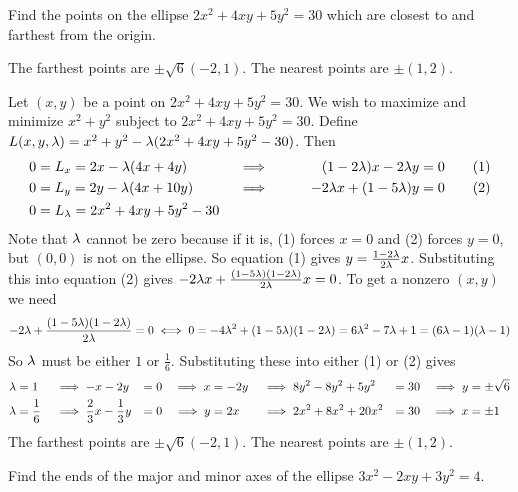 \begin{question}[M200 2004A] %
Find the points on the ellipse $2x^2 + 4xy + 5y^2 = 30$ which are closest 
to and farthest from the origin.
\end{question}

%

\begin{answer}
The farthest points are $\pm\sqrt{6}(-2,1)$.
The nearest points are $\pm(1,2)$.
\end{answer}

\begin{solution}
Let $(x,y)$ be a point on $2x^2 + 4xy + 5y^2 = 30$. 
We wish to maximize and minimize $x^2+y^2$ subject to $2x^2 + 4xy + 5y^2 = 30$. 
Define $L(x,y,\lambda)=x^2+y^2-\lambda(2x^2 + 4xy + 5y^2 - 30)$. Then
\begin{alignat*}{5}
0&=L_x=2x-\lambda (4x+4y)\qquad&&\implies\qquad &(1-2\lambda)x-2\lambda y&=0\tag{1} \\
0&=L_y=2y-\lambda (4x+10y)\qquad&&\implies& -2\lambda x+(1-5\lambda)y&=0\tag{2} \\
0&=L_\lambda=2x^2 + 4xy + 5y^2 - 30
\end{alignat*}
 Note that
$\lambda$ cannot be zero because if it is, (1) forces $x=0$ and (2) forces
$y=0$, but $(0,0)$ is not on the ellipse. So equation (1) 
gives $y=\frac{1-2\lambda}{2\lambda}x$. Substituting this into
equation (2) gives $-2\lambda x+\frac{(1-5\lambda)(1-2\lambda)}{2\lambda}x=0$. To get a nonzero
$(x,y)$ we need 
\begin{equation*}
-2\lambda +\frac{(1-5\lambda)(1-2\lambda)}{2\lambda}=0\iff 0=-4\lambda^2+(1-5\lambda)(1-2\lambda)
=6\lambda^2-7\lambda+1=(6\lambda-1)(\lambda-1)
\end{equation*}
So $\lambda$ must be either $1$ or $\frac{1}{6}$. Substituting these into either (1) or (2) gives
\begin{alignat*}{7}
\lambda&=1&&\implies -x-2y&=0 
      &&\implies x&=-2y
      &&\implies 8y^2-8y^2+5y^2&=30
      &&\implies y&=\pm \sqrt{6}\\
\lambda&=\frac{1}{6}&&\implies \frac{2}{3} x-\frac{1}{3} y&=0 
                &&\implies y&=2x
                &&\implies 2x^2+8x^2+20x^2&=30
                &&\implies x&=\pm 1
\end{alignat*}
The farthest points are $\pm\sqrt{6}(-2,1)$.
The nearest points are $\pm(1,2)$.
\end{solution}

\begin{question}
Find the ends of the major and minor axes of the ellipse 
$3x^2-2xy+3y^2=4$.
\end{question}

